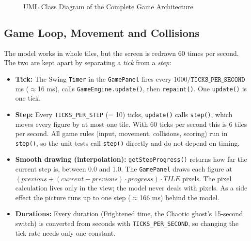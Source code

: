 \documentclass[11pt, a4paper]{article}
\begin{document}
\begin{figure}[h!]
{
    } %
    \caption{UML Class Diagram of the Complete Game Architecture}
    \label{fig:uml_complete_diagram}
\end{figure}

\clearpage

\subsection{Game Loop, Movement and Collisions}
\label{sec:game_loop}
The model works in whole tiles, but the screen is redrawn 60 times per second. The two are kept apart by separating a \textit{tick} from a \textit{step}:
\begin{itemize}
    \item \textbf{Tick:} The Swing \texttt{Timer} in the \texttt{GamePanel} fires every $1000 / \texttt{TICKS\_PER\_SECOND}$ ms ($\approx$16 ms), calls \texttt{GameEngine.update()}, then \texttt{repaint()}. One \texttt{update()} is one tick.
    \item \textbf{Step:} Every \texttt{TICKS\_PER\_STEP} (= 10) ticks, \texttt{update()} calls \texttt{step()}, which moves every figure by at most one tile. With 60 ticks per second this is 6 tiles per second. All game rules (input, movement, collisions, scoring) run in \texttt{step()}, so the unit tests call \texttt{step()} directly and do not depend on timing.
    \item \textbf{Smooth drawing (interpolation):} \texttt{getStepProgress()} returns how far the current step is, between 0.0 and 1.0. The \texttt{GamePanel} draws each figure at $(\textit{previous} + (\textit{current} - \textit{previous}) \cdot \textit{progress}) \cdot \textit{TILE}$ pixels. The pixel calculation lives only in the view; the model never deals with pixels. As a side effect the picture runs up to one step ($\approx$166 ms) behind the model.
    \item \textbf{Durations:} Every duration (Frightened time, the Chaotic ghost's 15-second switch) is converted from seconds with \texttt{TICKS\_PER\_SECOND}, so changing the tick rate needs only one constant.
\end{itemize}
\end{document}
